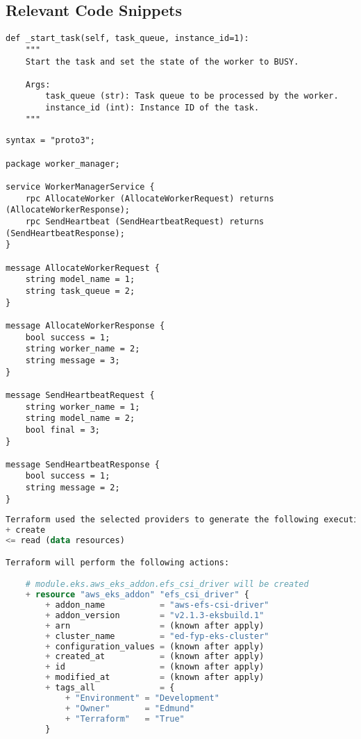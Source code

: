 \begin{appendices}
\chapter{Relevant Code Snippets} \label{chapter:appendix}

\begin{lstlisting}[caption={Example Code Documentation}, label={lst:code_documentation}]
def _start_task(self, task_queue, instance_id=1):
    """
    Start the task and set the state of the worker to BUSY.

    Args:
        task_queue (str): Task queue to be processed by the worker.
        instance_id (int): Instance ID of the task.
    """
\end{lstlisting}

\begin{lstlisting}[language=Proto3, caption={Worker Manager Server gRPC Proto File}, label={lst:worker_manager_server}]
syntax = "proto3";

package worker_manager;

service WorkerManagerService {
    rpc AllocateWorker (AllocateWorkerRequest) returns (AllocateWorkerResponse);
    rpc SendHeartbeat (SendHeartbeatRequest) returns (SendHeartbeatResponse);
}

message AllocateWorkerRequest {
    string model_name = 1;
    string task_queue = 2;
}

message AllocateWorkerResponse {
    bool success = 1;
    string worker_name = 2;
    string message = 3;
}

message SendHeartbeatRequest {
    string worker_name = 1;
    string model_name = 2;
    bool final = 3;
}

message SendHeartbeatResponse {
    bool success = 1;
    string message = 2;
}
\end{lstlisting}

\begin{lstlisting}[language=Terraform, caption={Terraform Plan Output}, label={lst:terraform_plan}]
Terraform used the selected providers to generate the following execution plan. Resource actions are indicated with the following symbols:
+ create
<= read (data resources)

Terraform will perform the following actions:

    # module.eks.aws_eks_addon.efs_csi_driver will be created
    + resource "aws_eks_addon" "efs_csi_driver" {
        + addon_name           = "aws-efs-csi-driver"
        + addon_version        = "v2.1.3-eksbuild.1"
        + arn                  = (known after apply)
        + cluster_name         = "ed-fyp-eks-cluster"
        + configuration_values = (known after apply)
        + created_at           = (known after apply)
        + id                   = (known after apply)
        + modified_at          = (known after apply)
        + tags_all             = {
            + "Environment" = "Development"
            + "Owner"       = "Edmund"
            + "Terraform"   = "True"
        }
    

\end{lstlisting}
\end{appendices}
